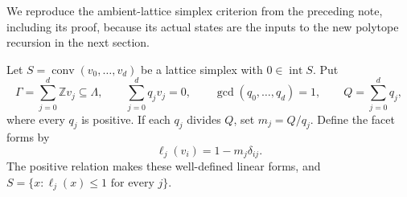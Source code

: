\documentclass[11pt,a4paper]{article}
\theoremstyle{remark}\newtheorem{remark}[theorem]{Remark}
\begin{document}
We reproduce the ambient-lattice simplex criterion from the preceding
note, including its proof, because its actual states are the inputs
to the new polytope recursion in the next section.

Let $S=\operatorname{conv}(v_0,\ldots,v_d)$ be a lattice simplex with
$0\in\operatorname{int}S$. Put
\[
 \Gamma=\sum_{j=0}^{d}\mathbb Z v_j\subseteq\Lambda,
 \qquad \sum_{j=0}^{d}q_jv_j=0,
 \qquad \gcd(q_0,\ldots,q_d)=1,
 \qquad Q=\sum_{j=0}^{d}q_j,
\]
where every $q_j$ is positive.  If each $q_j$ divides $Q$, set
$m_j=Q/q_j$. Define the facet forms by
\begin{equation}\label{eq:facetforms}
 \ell_j(v_i)=1-m_j\delta_{ij}.
\end{equation}
The positive relation makes these well-defined linear forms, and
$S=\{x:\ell_j(x)\le1\text{ for every }j\}$.
\end{document}
